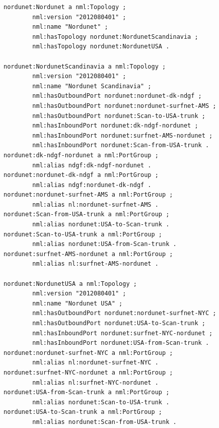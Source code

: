 \documentclass[12pt]{article}  %
\begin{document}
\begin{verbatim}
nordunet:Nordunet a nml:Topology ;
        nml:version "2012080401" ;
        nml:name "Nordunet" ;
        nml:hasTopology nordunet:NordunetScandinavia ;
        nml:hasTopology nordunet:NordunetUSA .

nordunet:NordunetScandinavia a nml:Topology ;
        nml:version "2012080401" ;
        nml:name "Nordunet Scandinavia" ;
        nml:hasOutboundPort nordunet:nordunet-dk-ndgf ;
        nml:hasOutboundPort nordunet:nordunet-surfnet-AMS ;
        nml:hasOutboundPort nordunet:Scan-to-USA-trunk ;
        nml:hasInboundPort nordunet:dk-ndgf-nordunet ;
        nml:hasInboundPort nordunet:surfnet-AMS-nordunet ;
        nml:hasInboundPort nordunet:Scan-from-USA-trunk .
nordunet:dk-ndgf-nordunet a nml:PortGroup ;
        nml:alias ndgf:dk-ndgf-nordunet .
nordunet:nordunet-dk-ndgf a nml:PortGroup ;
        nml:alias ndgf:nordunet-dk-ndgf .
nordunet:nordunet-surfnet-AMS a nml:PortGroup ;
        nml:alias nl:nordunet-surfnet-AMS .
nordunet:Scan-from-USA-trunk a nml:PortGroup ;
        nml:alias nordunet:USA-to-Scan-trunk .
nordunet:Scan-to-USA-trunk a nml:PortGroup ;
        nml:alias nordunet:USA-from-Scan-trunk .
nordunet:surfnet-AMS-nordunet a nml:PortGroup ;
        nml:alias nl:surfnet-AMS-nordunet .

nordunet:NordunetUSA a nml:Topology ;
        nml:version "2012080401" ;
        nml:name "Nordunet USA" ;
        nml:hasOutboundPort nordunet:nordunet-surfnet-NYC ;
        nml:hasOutboundPort nordunet:USA-to-Scan-trunk ;
        nml:hasInboundPort nordunet:surfnet-NYC-nordunet ;
        nml:hasInboundPort nordunet:USA-from-Scan-trunk .
nordunet:nordunet-surfnet-NYC a nml:PortGroup ;
        nml:alias nl:nordunet-surfnet-NYC .
nordunet:surfnet-NYC-nordunet a nml:PortGroup ;
        nml:alias nl:surfnet-NYC-nordunet .
nordunet:USA-from-Scan-trunk a nml:PortGroup ;
        nml:alias nordunet:Scan-to-USA-trunk .
nordunet:USA-to-Scan-trunk a nml:PortGroup ;
        nml:alias nordunet:Scan-from-USA-trunk .
\end{verbatim}
\end{document}
